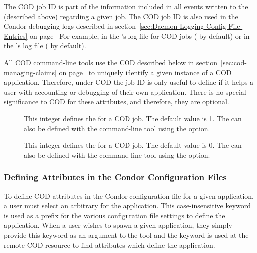 The COD job ID is part of the information included in all
events written to the  (described above)
regarding a given job.
The COD job ID is also used in the Condor debugging logs described in
section~\ref{sec:Daemon-Logging-Config-File-Entries} on
page~\pageref{sec:Daemon-Logging-Config-File-Entries}
For example, in the 's log file for COD jobs
( by default) or in the 's log
file ( by default).

All COD command-line tools use the COD  described below
in section~\ref{sec:cod-managing-claims} on
page~\pageref{sec:cod-managing-claims} to uniquely identify a given
instance of a COD application.
Therefore, under COD the job ID is only useful to define if it helps a
user with accounting or debugging of their own application.
There is no special significance to COD for these attributes, and
therefore, they are optional.
  
\begin{description}
 \item[] This integer defines the
    for a COD job.
   The default value is 1.
   The  can also be defined with the
    command-line tool using the 
   option.

 \item[]  This integer defines the
    for a COD job.
   The default value is 0.
   The  can also be defined with the
    command-line tool using the 
   option.

\end{description}


\subsubsection{\label{sec:cod-config-attrs}
Defining Attributes in the Condor Configuration Files}


To define COD attributes in the Condor configuration file for a given
application, a user must select an arbitrary  for
the application.
This case-insensitive keyword is used as a prefix for the various
configuration file settings to define the application.
When a user wishes to spawn a given application, they simply provide
this keyword as an argument to the  tool and the keyword
is used at the remote COD resource to find attributes which define the
application.


